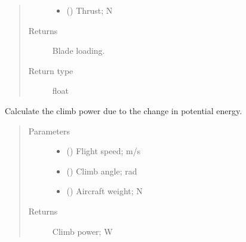 \documentclass[letterpaper,10pt,english]{sphinxmanual}
\begin{document}
\begin{fulllineitems}
\begin{fulllineitems}
\begin{quote}
\begin{description}
\begin{itemize}
\item {} 
\sphinxAtStartPar
{} () \textendash{} Thrust; N

\end{itemize}

\item[{Returns}] \leavevmode
\sphinxAtStartPar
Blade loading.

\item[{Return type}] \leavevmode
\sphinxAtStartPar
float

\end{description}\end{quote}

\end{fulllineitems}


\begin{fulllineitems}
\label{\detokenize{modules/rotor:rotor.Rotor.get_climb_power}}
\sphinxAtStartPar
Calculate the climb power due to the change in potential energy.
\begin{quote}\begin{description}
\item[{Parameters}] \leavevmode\begin{itemize}
\item {} 
\sphinxAtStartPar
{} () \textendash{} Flight speed; m/s

\item {} 
\sphinxAtStartPar
{} () \textendash{} Climb angle; rad

\item {} 
\sphinxAtStartPar
{} () \textendash{} Aircraft weight; N

\end{itemize}

\item[{Returns}] \leavevmode
\sphinxAtStartPar
Climb power; W


\end{description}
\end{quote}
\end{fulllineitems}
\end{fulllineitems}
\end{document}
